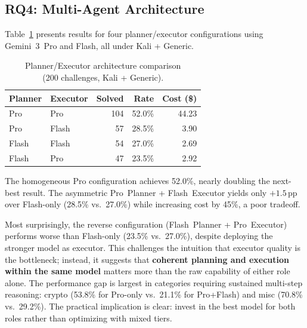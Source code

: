 \documentclass[conference]{IEEEtran}
\begin{document}
\subsection{RQ4: Multi-Agent Architecture}

Table~\ref{tab:rq4_results} presents results for four planner/executor configurations using Gemini~3~Pro and Flash, all under Kali + Generic.

\begin{table}[htb]
\centering
\caption{Planner/Executor architecture comparison \\(200 challenges, Kali + Generic).}
\label{tab:rq4_results}
\footnotesize
\begin{tabular}{@{}llrrr@{}}
\toprule
\textbf{Planner} & \textbf{Executor} & \textbf{Solved} & \textbf{Rate} & \textbf{Cost (\$)} \\
\midrule
Pro   & Pro   & 104 & 52.0\% & 44.23 \\
Pro   & Flash &  57 & 28.5\% &  3.90 \\
Flash & Flash &  54 & 27.0\% &  2.69 \\
Flash & Pro   &  47 & 23.5\% &  2.92 \\
\bottomrule
\end{tabular}
\end{table}

The homogeneous Pro configuration achieves 52.0\%, nearly doubling the next-best result. The asymmetric Pro~Planner + Flash~Executor yields only $+1.5$\,pp over Flash-only (28.5\% vs.\ 27.0\%) while increasing cost by 45\%, a poor tradeoff.

Most surprisingly, the reverse configuration (Flash~Planner + Pro~Executor) performs worse than Flash-only (23.5\% vs.\ 27.0\%), despite deploying the stronger model as executor. This challenges the intuition that executor quality is the bottleneck; instead, it suggests that \textbf{coherent planning and execution within the same model} matters more than the raw capability of either role alone. The performance gap is largest in categories requiring sustained multi-step reasoning: crypto (53.8\% for Pro-only vs.\ 21.1\% for Pro+Flash) and misc (70.8\% vs.\ 29.2\%). The practical implication is clear: invest in the best model for both roles rather than optimizing with mixed tiers.
\end{document}
